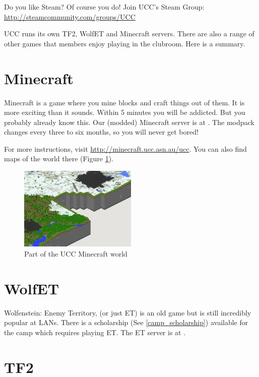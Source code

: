 \label{Games}

Do you like Steam? Of course you do! Join UCC's Steam Group: \url{http://steamcommunity.com/groups/UCC}

\noindent UCC runs its own TF2, WolfET and Minecraft servers.
There are also a range of other games that members enjoy playing in the clubroom. Here is a summary.

\section{Minecraft}

Minecraft is a game where you mine blocks and craft things out of them. It is more exciting than it sounds. Within 5 minutes you will be addicted. But you probably already know this. 
Our (modded) Minecraft server is at . The modpack changes every three to six months, so you will never get bored!

For more instructions, visit \url{http://minecraft.ucc.asn.au/ucc}. You can also find maps of the world there (Figure \ref{minecraft_pigmap.png}).

\begin{figure}[H]
	\centering
	\includegraphics[width=0.5\textwidth]{figures/minecraft_pigmap.png}
	\caption{Part of the UCC Minecraft world}
	\label{minecraft_pigmap.png}
\end{figure}

\section{WolfET}

Wolfenstein: Enemy Territory, (or just ET) is an old game but is still incredibly popular at LANs. There is a scholarship (See \ref{camp_scholarship}) available for the camp which requires playing ET. The ET server is at .

\section{TF2}

